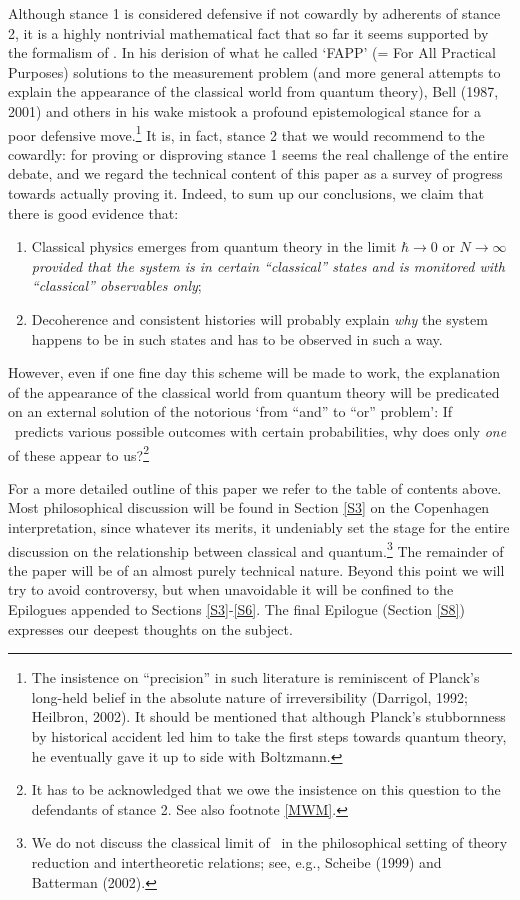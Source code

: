 \documentclass[12pt]{article}
\newcommand{\raw}{\rightarrow} \newcommand{\rat}{\mapsto}
\begin{document}
Although stance 1 is considered defensive if not cowardly by adherents of stance 2, it is a highly nontrivial mathematical fact that so far it seems supported by the formalism of \qm. In his derision  of what he called `FAPP' (= For All Practical Purposes) solutions to the 
measurement problem (and more general attempts to explain the appearance of the classical world from quantum theory), Bell (1987, 2001)  and others in his wake mistook a profound epistemological stance for a poor defensive move.\footnote{The insistence on ``precision'' in such literature is reminiscent of Planck's long-held belief in the absolute nature of irreversibility (Darrigol, 1992; Heilbron, 2002). It should be mentioned that although Planck's stubbornness by historical accident led him to take the first steps towards quantum theory, he eventually gave it up to side with Boltzmann.} It is, in fact, stance 2 that we would recommend to the cowardly: for 
 proving  or disproving stance 1 seems the real challenge of the entire debate, and we regard the technical content of this paper as a survey of progress towards actually proving it. Indeed, to sum up our conclusions, we claim that there is good evidence that:
\begin{enumerate}
\item Classical physics emerges from quantum theory in the limit $\hbar\rightarrow 0$ or  $N\raw\infty$ {\it provided that the system is in certain ``classical'' states and is monitored 
with ``classical'' observables only};
\item Decoherence and consistent histories will probably  explain  {\it why} the system happens to be in such states and has to be observed in such a way.
\end{enumerate}
However, even if one fine day this scheme will be made to work, the explanation of the appearance of the classical world from quantum theory will be predicated on an external solution of the notorious `from ``and'' to ``or'' problem': If \qm\ predicts various possible outcomes with certain probabilities, why does only {\it one} of these appear to us?\footnote{It has to be acknowledged that we owe the insistence on this question to the defendants of stance 2.
See also footnote \ref{MWM}.}

For a more detailed outline of this paper we refer to the table of contents above. Most philosophical discussion will be found in Section \ref{S3} on the Copenhagen interpretation, since whatever its merits, it undeniably set the stage for the entire discussion on the relationship between classical and quantum.\footnote{We do not discuss the classical limit of \qm\ in the philosophical setting of theory reduction and intertheoretic relations;
see, e.g.,  Scheibe (1999) and Batterman (2002).}
 The remainder of the paper will be of an almost purely technical nature. Beyond this point we will  try to avoid controversy, but 
when unavoidable it will be  confined to the Epilogues appended to Sections \ref{S3}-\ref{S6}. 
The final Epilogue (Section \ref{S8}) expresses our deepest thoughts on the subject. 
\end{document}
